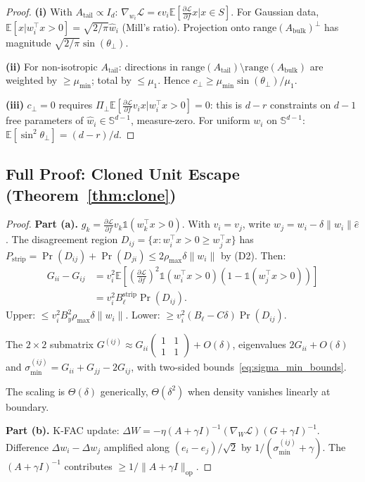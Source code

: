 \documentclass{article}
\providecommand{\E}{\mathbb{E}}
\providecommand{\norm}[1]{\lVert #1 \rVert}
\theoremstyle{plain}
\theoremstyle{definition}
\theoremstyle{remark}
\begin{document}
\begin{proof}
\textbf{(i)} With $A_{\mathrm{tail}}\propto I_d$: $\nabla_{w_i}\mathcal{L} = \epsilon v_i\E[\frac{\partial\mathcal{L}}{\partial f}x|x\in S]$. For Gaussian data, $\E[x|w_i^\top x>0]=\sqrt{2/\pi}\hat{w}_i$ (Mill's ratio). Projection onto $\mathrm{range}(A_{\mathrm{bulk}})^\perp$ has magnitude $\sqrt{2/\pi}\sin(\theta_\perp)$.

\textbf{(ii)} For non-isotropic $A_{\mathrm{tail}}$: directions in $\mathrm{range}(A_{\mathrm{tail}})\setminus\mathrm{range}(A_{\mathrm{bulk}})$ are weighted by $\geq\mu_{\min}$; total by $\leq\mu_1$. Hence $c_\perp \geq \mu_{\min}\sin(\theta_\perp)/\mu_1$.

\textbf{(iii)} $c_\perp=0$ requires $\Pi_\perp\E[\frac{\partial\mathcal{L}}{\partial f}v_i x|w_i^\top x>0]=0$: this is $d-r$ constraints on $d-1$ free parameters of $\hat{w}_i\in\mathbb{S}^{d-1}$, measure-zero. For uniform $w_i$ on $\mathbb{S}^{d-1}$: $\E[\sin^2\theta_\perp]=(d-r)/d$.
\end{proof}

\subsection{Full Proof: Cloned Unit Escape (Theorem~\ref{thm:clone})}

\begin{proof}
\textbf{Part (a).} $g_k = \frac{\partial\mathcal{L}}{\partial f}v_k\mathbb{1}(w_k^\top x>0)$. With $v_i=v_j$, write $w_j=w_i-\delta\norm{w_i}\hat{e}$. The disagreement region $D_{ij}=\{x:w_i^\top x>0\geq w_j^\top x\}$ has $P_{\mathrm{strip}}=\Pr(D_{ij})+\Pr(D_{ji})\leq 2\rho_{\max}\delta\norm{w_i}$ by (D2). Then:
\begin{align}
    G_{ii}-G_{ij} &= v_i^2\E[(\tfrac{\partial\mathcal{L}}{\partial f})^2\mathbb{1}(w_i^\top x>0)(1-\mathbb{1}(w_j^\top x>0))] \nonumber\\
    &= v_i^2 B_\ell^{\mathrm{strip}}\Pr(D_{ij}).
\end{align}
Upper: $\leq v_i^2 B_y^2\rho_{\max}\delta\norm{w_i}$. Lower: $\geq v_i^2(B_\ell-C\delta)\Pr(D_{ij})$.

The $2\times 2$ submatrix $G^{(ij)}\approx G_{ii}\left(\begin{smallmatrix}1&1\\1&1\end{smallmatrix}\right)+O(\delta)$, eigenvalues $2G_{ii}+O(\delta)$ and $\sigma_{\min}^{(ij)}=G_{ii}+G_{jj}-2G_{ij}$, with two-sided bounds~\eqref{eq:sigma_min_bounds}.

The scaling is $\Theta(\delta)$ generically, $\Theta(\delta^2)$ when density vanishes linearly at boundary.

\textbf{Part (b).} K-FAC update: $\Delta W=-\eta(A+\gamma I)^{-1}(\nabla_W\mathcal{L})(G+\gamma I)^{-1}$. Difference $\Delta w_i-\Delta w_j$ amplified along $(e_i-e_j)/\sqrt{2}$ by $1/(\sigma_{\min}^{(ij)}+\gamma)$. The $(A+\gamma I)^{-1}$ contributes $\geq 1/\norm{A+\gamma I}_{\mathrm{op}}$.
\end{proof}
\end{document}
